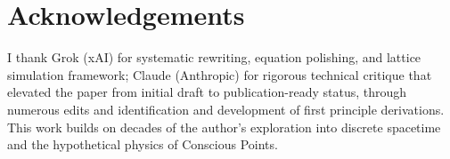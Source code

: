\documentclass[11pt,letterpaper]{article}
\begin{document}
\section{Acknowledgements}

I thank Grok (xAI) for systematic rewriting, equation polishing, and lattice simulation framework; Claude (Anthropic) for rigorous technical critique that elevated the paper from initial draft to publication-ready status, through numerous edits and identification and development of first principle derivations. This work builds on decades of the author's exploration into discrete spacetime and the hypothetical physics of Conscious Points.
\end{document}
